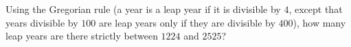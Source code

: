 Using the Gregorian rule (a year is a leap year if it is divisible by $4$, except that years divisible by $100$ are leap years only if they are divisible by $400$), how many leap years are there strictly between $1224$ and $2525$?
